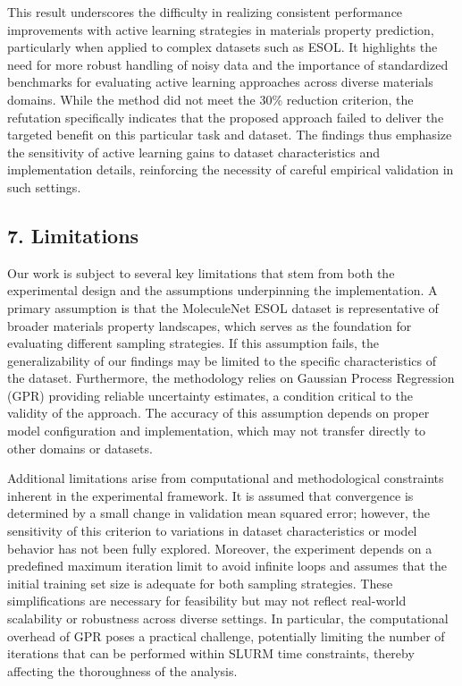 This result underscores the difficulty in realizing consistent performance improvements with active learning strategies in materials property prediction, particularly when applied to complex datasets such as ESOL. It highlights the need for more robust handling of noisy data and the importance of standardized benchmarks for evaluating active learning approaches across diverse materials domains. While the method did not meet the 30\% reduction criterion, the refutation specifically indicates that the proposed approach failed to deliver the targeted benefit on this particular task and dataset. The findings thus emphasize the sensitivity of active learning gains to dataset characteristics and implementation details, reinforcing the necessity of careful empirical validation in such settings.

\subsection*{7. Limitations}

Our work is subject to several key limitations that stem from both the experimental design and the assumptions underpinning the implementation. A primary assumption is that the MoleculeNet ESOL dataset is representative of broader materials property landscapes, which serves as the foundation for evaluating different sampling strategies. If this assumption fails, the generalizability of our findings may be limited to the specific characteristics of the dataset. Furthermore, the methodology relies on Gaussian Process Regression (GPR) providing reliable uncertainty estimates, a condition critical to the validity of the approach. The accuracy of this assumption depends on proper model configuration and implementation, which may not transfer directly to other domains or datasets.

Additional limitations arise from computational and methodological constraints inherent in the experimental framework. It is assumed that convergence is determined by a small change in validation mean squared error; however, the sensitivity of this criterion to variations in dataset characteristics or model behavior has not been fully explored. Moreover, the experiment depends on a predefined maximum iteration limit to avoid infinite loops and assumes that the initial training set size is adequate for both sampling strategies. These simplifications are necessary for feasibility but may not reflect real-world scalability or robustness across diverse settings. In particular, the computational overhead of GPR poses a practical challenge, potentially limiting the number of iterations that can be performed within SLURM time constraints, thereby affecting the thoroughness of the analysis.

